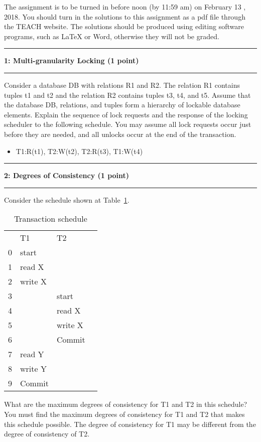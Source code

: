 \documentclass[11pt]{article}
\newcommand\question[2]{\vspace{.25in}\hrule\textbf{#1: #2}\vspace{.5em}\hrule\vspace{.10in}}
\begin{document}
\raggedright
\newcommand\NAME{Oregon State University}  %
\newcommand\ANDREWID{}     %
\newcommand\HWNUM{5}              %


The assignment is to be turned in before noon (by 11:59 am) on February 13 , 2018. 
You should turn in the solutions to this assignment as a pdf file through the TEACH website.
The solutions should be produced using editing software programs, such as LaTeX or Word, otherwise they will not be graded.


\question{1}{Multi-granularity Locking (1 point)}
Consider a database DB with relations R1 and R2. 
The relation R1 contains tuples t1 and t2 and the relation R2 contains
tuples t3, t4, and t5. Assume that the database DB, relations, and tuples form a hierarchy of lockable database elements.
Explain the sequence of lock requests and the response of the locking scheduler to the following schedule. 
You may assume all lock requests occur just before they are needed, and all unlocks occur at the end of the transaction.
\vspace{0.5em}

\begin{itemize}
\item T1:R(t1), T2:W(t2), T2:R(t3), T1:W(t4)
\end{itemize}

\question{2}{Degrees of Consistency (1 point)}
Consider the schedule shown at Table~\ref{schedule}.

\begin{table}[h!]
\begin{tabular}{ l |l |l |l |}
   &  T1 & T2 \\
  0 & start &   \\
  1 & read X &  \\
  2 & write X &   \\
  3 &  &  start \\
  4 &  &  read X \\
  5 &  &  write X \\
  6 &  &  Commit \\
  7 & read Y&  \\
  8 & write Y&  \\
  9 & Commit&  \\
\end{tabular}
\caption{Transaction schedule}
\label{schedule} 
\end{table}
\vspace{-1em} 

What are the maximum degrees of consistency for T1 and T2
in this schedule? You must find the maximum degrees of consistency for T1 and T2 that makes this schedule possible.
The degree of consistency for T1 may be different from the degree of consistency of T2.
\end{document}
